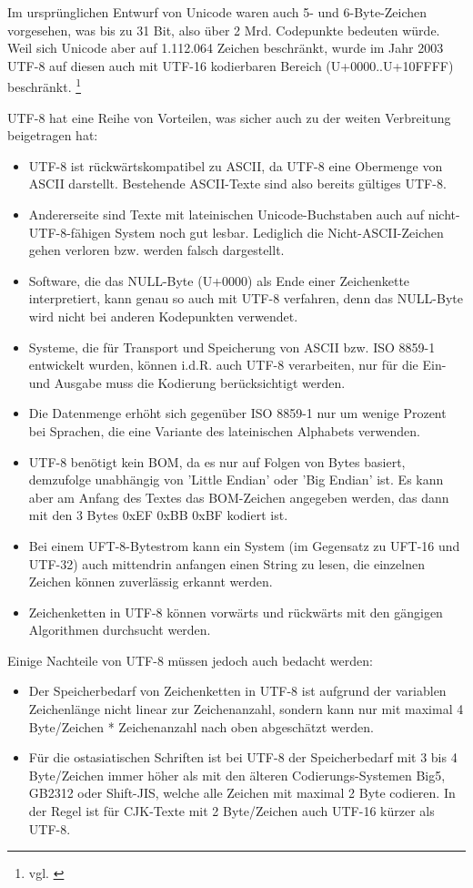 Im ursprünglichen Entwurf von Unicode waren auch 5- und 6-Byte-Zeichen vorgesehen, was bis zu 31 Bit, also über 2 Mrd. Codepunkte bedeuten würde. Weil sich Unicode aber auf 1.112.064 Zeichen beschränkt, wurde im Jahr 2003 UTF-8 auf diesen auch mit UTF-16 kodierbaren Bereich (U+0000..U+10FFFF) beschränkt. \footnote{vgl. \cite{IETF2003}}

UTF-8 hat eine Reihe von Vorteilen, was sicher auch zu der weiten Verbreitung beigetragen hat:
\begin{itemize}
\item UTF-8 ist rückwärtskompatibel zu ASCII, da UTF-8 eine Obermenge von ASCII darstellt. Bestehende ASCII-Texte sind also bereits gültiges UTF-8.
\item Andererseite sind Texte mit lateinischen Unicode-Buchstaben auch auf nicht-UTF-8-fähigen System noch gut lesbar. Lediglich die Nicht-ASCII-Zeichen gehen verloren bzw. werden falsch dargestellt.
\item Software, die das NULL-Byte (U+0000) als Ende einer Zeichenkette interpretiert, kann genau so auch mit UTF-8 verfahren, denn das NULL-Byte wird nicht bei anderen Kodepunkten verwendet. 
\item Systeme, die für Transport und Speicherung von ASCII bzw. ISO 8859-1 entwickelt wurden, können i.d.R. auch UTF-8 verarbeiten, nur für die Ein- und Ausgabe muss die Kodierung berücksichtigt werden.
\item Die Datenmenge erhöht sich gegenüber ISO 8859-1 nur um wenige Prozent bei Sprachen, die eine Variante des lateinischen Alphabets verwenden.
\item UTF-8 benötigt kein BOM, da es nur auf Folgen von Bytes basiert, demzufolge unabhängig von 'Little Endian' oder 'Big Endian' ist. Es kann aber am Anfang des Textes das BOM-Zeichen angegeben werden, das dann mit den 3 Bytes 0xEF 0xBB 0xBF kodiert ist.
\item Bei einem UFT-8-Bytestrom kann ein System (im Gegensatz zu UFT-16 und UTF-32) auch mittendrin anfangen einen String zu lesen, die einzelnen Zeichen können zuverlässig erkannt werden.
\item Zeichenketten in UTF-8 können vorwärts und rückwärts mit den gängigen Algorithmen durchsucht werden.
\end{itemize}

Einige Nachteile von UTF-8 müssen jedoch auch bedacht werden:
\begin{itemize}
\item Der Speicherbedarf von Zeichenketten in UTF-8 ist aufgrund der variablen Zeichenlänge nicht linear zur Zeichenanzahl, sondern kann nur mit maximal 4 Byte/Zeichen * Zeichenanzahl nach oben abgeschätzt werden.
\item Für die ostasiatischen Schriften ist bei UTF-8 der Speicherbedarf mit 3 bis 4 Byte/Zeichen immer höher als mit den älteren Codierungs-Systemen Big5, GB2312 oder Shift-JIS, welche alle Zeichen mit maximal 2 Byte codieren. In der Regel ist für CJK-Texte mit 2 Byte/Zeichen auch UTF-16 kürzer als UTF-8.
\end{itemize}

